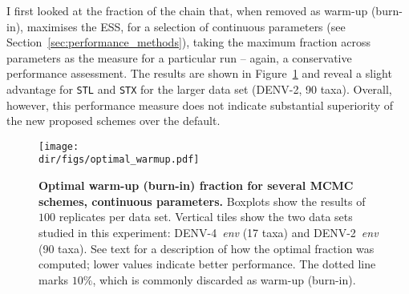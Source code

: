 I first looked at the fraction of the chain that, when removed as warm-up (burn-in), maximises the ESS, for a selection of continuous parameters (see Section~\ref{sec:performance_methods}), taking the maximum fraction across parameters as the measure for a particular run -- again, a conservative performance assessment.
The results are shown in Figure~\ref{fig:optimal_burnin} and reveal a slight advantage for \verb|STL| and \verb|STX| for the larger data set (DENV-2, 90 taxa).
Overall, however, this performance measure does not indicate substantial superiority of the new proposed schemes over the default.

\begin{figure}[!ht]
\begin{center}
\texttt{[image: \\dir/figs/optimal\_warmup.pdf]} 
\end{center}
 \caption[Optimal warm-up (burn-in) fraction for several MCMC schemes, continuous parameters.]{\textbf{Optimal warm-up (burn-in) fraction for several MCMC schemes, continuous parameters.}
   Boxplots show the results of $100$ replicates per data set.
  Vertical tiles show the two data sets studied in this experiment: DENV-4~\textit{env} (17 taxa) and DENV-2~\textit{env} (90 taxa).
  See text for a description of how the optimal fraction was computed; lower values indicate better performance.
  The dotted line marks $10\%$, which is commonly discarded as warm-up (burn-in).
  }
 \label{fig:optimal_burnin}
\end{figure}

